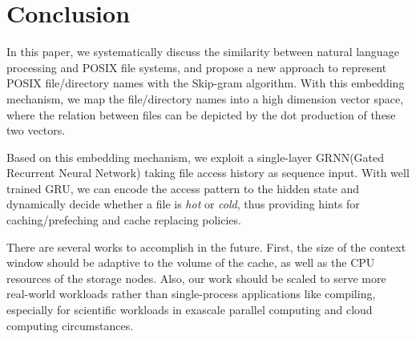 \documentclass[conference]{IEEEtran}
\begin{document}
\section{Conclusion}
In this paper, we systematically discuss the similarity between natural language processing and POSIX file systems,
and propose a new approach to represent POSIX file/directory names with the Skip-gram algorithm. 
With this embedding mechanism, we map the file/directory names into a high dimension vector space, 
where the relation between files can be depicted by the dot production of these two vectors.  

Based on this embedding mechanism, we exploit a single-layer GRNN(Gated Recurrent Neural Network) taking file access history as sequence input.
With well trained GRU, we can encode the access pattern to the hidden state and dynamically decide whether a file is \textit{hot} or \textit{cold},
thus providing hints for caching/prefeching and cache replacing policies.

There are several works to accomplish in the future. First, the size of the context window should be adaptive to the volume of the cache, 
as well as the CPU resources of the storage nodes.
Also, our work should be scaled to serve more real-world workloads rather than single-process applications like compiling, 
especially for scientific workloads in exascale parallel computing and cloud computing circumstances.


\end{document}
